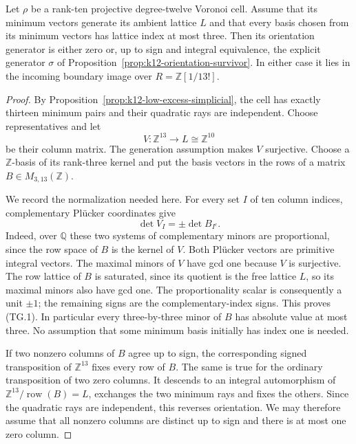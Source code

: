 \begin{proposition}
\label{prop:k12-trimodular-generated}
Let $\rho$ be a rank-ten projective degree-twelve Voronoi cell.
Assume that its minimum vectors generate its ambient lattice $L$
and that every basis chosen from its minimum vectors has lattice
index at most three. Then its orientation generator is either
zero or, up to sign and integral equivalence, the explicit
generator $\sigma$ of
Proposition~\ref{prop:k12-orientation-survivor}.
In either case it lies in the incoming boundary image over
$R=\mathbb Z[1/13!]$.
\end{proposition}

\begin{proof}
By Proposition~\ref{prop:k12-low-excess-simplicial}, the cell has
exactly thirteen minimum pairs and their quadratic rays are
independent. Choose representatives and let
\[
 V:\mathbb Z^{13}\longrightarrow L\cong\mathbb Z^{10}
\]
be their column matrix. The generation assumption makes $V$
surjective. Choose a $\mathbb Z$-basis of its rank-three kernel
and put the basis vectors in the rows of a matrix
$B\in M_{3,13}(\mathbb Z)$.

We record the normalization needed here. For every set $I$ of
ten column indices, complementary Pl\"ucker coordinates give
\[
       \det V_I=\pm\det B_{I^c}.                         \tag{TG.1}
\]
Indeed, over $\mathbb Q$ these two systems of complementary
minors are proportional, since the row space of $B$ is the
kernel of $V$. Both Pl\"ucker vectors are primitive integral
vectors. The maximal minors of $V$ have gcd one because $V$
is surjective. The row lattice of $B$ is saturated, since its
quotient is the free lattice $L$, so its maximal minors also
have gcd one. The proportionality scalar is consequently a
unit $\pm1$; the remaining signs are the complementary-index
signs. This proves (TG.1). In particular every three-by-three
minor of $B$ has absolute value at most three. No assumption
that some minimum basis initially has index one is needed.

If two nonzero columns of $B$ agree up to sign, the corresponding
signed transposition of $\mathbb Z^{13}$ fixes every row of $B$.
The same is true for the ordinary transposition of two zero
columns. It descends to an integral automorphism of
$\mathbb Z^{13}/\operatorname{row}(B)=L$, exchanges the two
minimum rays and fixes the others. Since the quadratic rays
are independent, this reverses orientation. We may therefore
assume that all nonzero columns are distinct up to sign and
there is at most one zero column.


\end{proof}
